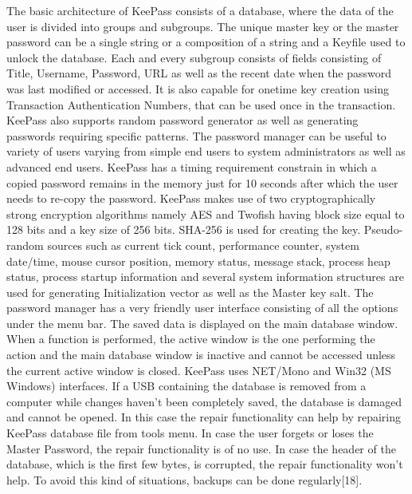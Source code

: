 \documentclass[12pt]{article}
\begin{document}
The basic architecture of KeePass consists of a database, where the data of the user is divided into groups and subgroups. The unique master key or the master password can be a single string or a composition of a string and a Keyfile used to unlock the database. Each and every subgroup consists of fields consisting of Title, Username, Password, URL as well as the recent date when the password was last modified or accessed. It is also capable for onetime key creation using Transaction Authentication Numbers, that can be used once in the transaction. KeePass also supports random password generator as well as generating passwords requiring specific patterns. The password manager can be useful to variety of users varying from simple end users to system administrators as well as advanced end users. KeePass has a timing requirement constrain in which a copied password remains in the memory just for 10 seconds after which the user needs to re-copy the password. KeePass makes use of two cryptographically strong encryption algorithms namely AES and Twofish having block size equal to 128 bits and a key size of 256 bits. SHA-256 is used for creating the key. Pseudo-random sources such as current tick count, performance counter, system date/time, mouse cursor position, memory status,  message stack, process heap status, process startup information and several system information structures are used for generating Initialization vector as well as the Master key salt.
      The password manager has a very friendly user interface consisting of all the options under the menu bar. The saved data is displayed on the main database window. When a function is performed, the active window is the one performing the action and  the main database window is inactive and cannot be accessed unless the current active window is closed. KeePass  uses NET/Mono and Win32 (MS Windows) interfaces. If a USB containing the database is removed from a computer while changes haven’t been completely saved, the database is damaged and cannot be opened. In this case the repair functionality can help by repairing KeePass database file from tools menu. In case the user forgets or loses the Master Password, the repair functionality is of no use. In case the header of the database, which is the first few bytes, is corrupted, the repair functionality won’t help. To avoid this kind of situations, backups can be done regularly[18]. 
\end{document}
